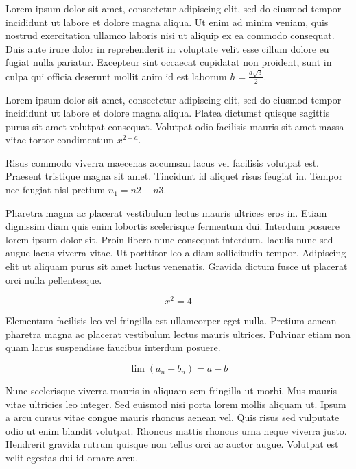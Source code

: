 \documentclass{article}
\begin{document}
	
   Lorem ipsum dolor sit amet, consectetur adipiscing elit, sed do eiusmod tempor incididunt ut labore et dolore magna aliqua. Ut enim ad minim veniam, quis nostrud exercitation ullamco laboris nisi ut aliquip ex ea commodo consequat. Duis aute irure dolor in reprehenderit in voluptate velit esse cillum dolore eu fugiat nulla pariatur. Excepteur sint occaecat cupidatat non proident, sunt in culpa qui officia deserunt mollit anim id est laborum 
   \begin{math}
    h=\frac{a\sqrt{3}}{2}
    \end{math}.
    \newline
    
    
    Lorem ipsum dolor sit amet, consectetur adipiscing elit, sed do eiusmod tempor incididunt ut labore et dolore magna aliqua. Platea dictumst quisque sagittis purus sit amet volutpat consequat. Volutpat odio facilisis mauris sit amet massa vitae tortor condimentum $ x^{2+a} $.
    \newline
    
    Risus commodo viverra maecenas accumsan lacus vel facilisis volutpat est. Praesent tristique magna sit amet. Tincidunt id aliquet risus feugiat in. Tempor nec feugiat nisl pretium \( n_{1}={n{2}-n{3}} \).
    \newline
    
    Pharetra magna ac placerat vestibulum lectus mauris ultrices eros in. Etiam dignissim diam quis enim lobortis scelerisque fermentum dui. Interdum posuere lorem ipsum dolor sit. Proin libero nunc consequat interdum. Iaculis nunc sed augue lacus viverra vitae. Ut porttitor leo a diam sollicitudin tempor. Adipiscing elit ut aliquam purus sit amet luctus venenatis. Gravida dictum fusce ut placerat orci nulla pellentesque.
    
    \[ x^2=4  \]
    
    Elementum facilisis leo vel fringilla est ullamcorper eget nulla. Pretium aenean pharetra magna ac placerat vestibulum lectus mauris ultrices. Pulvinar etiam non quam lacus suspendisse faucibus interdum posuere. 
    
    $$ \lim\left ( a_n-b_n \right )=a-b $$
    
    Nunc scelerisque viverra mauris in aliquam sem fringilla ut morbi. Mus mauris vitae ultricies leo integer. Sed euismod nisi porta lorem mollis aliquam ut. Ipsum a arcu cursus vitae congue mauris rhoncus aenean vel. Quis risus sed vulputate odio ut enim blandit volutpat. Rhoncus mattis rhoncus urna neque viverra justo. Hendrerit gravida rutrum quisque non tellus orci ac auctor augue. Volutpat est velit egestas dui id ornare arcu. 
    
\end{document}
